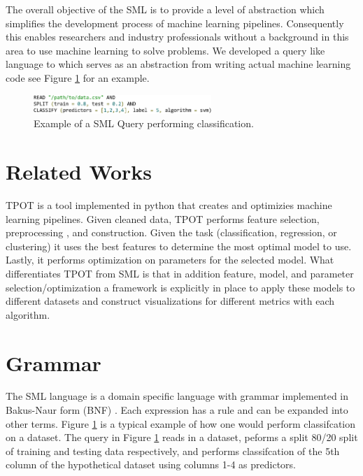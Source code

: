\documentclass[jair,twoside,11pt,theapa]{article}
\begin{document}
The overall objective of the SML is to provide a level of abstraction which simplifies the development process of machine learning pipelines. Consequently this enables researchers and industry professionals without a background in this area to use machine learning to solve problems. We developed a query like language to which serves as an abstraction from writing actual machine learning code see Figure \ref{fig:sml-ex-1} for an example.   

\begin{figure}
\includegraphics[width=0.6\textwidth]{figs/sml-ex-1.png}
\centering
\caption{Example of a SML Query performing classification.}
\label{fig:sml-ex-1}
\end{figure}

\section{Related Works}
\label{RelatedWorks}

TPOT \cite{TPOT} is a tool implemented in python that creates and optimizies machine learning pipelines. Given cleaned data, TPOT performs feature selection, preprocessing , and construction. Given the task (classification, regression, or clustering) it uses the best features to determine the most optimal model to use. Lastly, it performs optimization on parameters for the selected model. What differentiates TPOT from SML is that in addition feature, model, and parameter selection/optimization a framework is explicitly in place to apply these models to different datasets and construct visualizations for different metrics with each algorithm.

\section{Grammar}
\label{grammar}

The SML language is a domain specific language with grammar implemented in Bakus-Naur form (BNF) \cite{BNF}. Each expression has a rule and can be expanded into other terms. Figure \ref{fig:sml-ex-1} is a typical example of how one would perform classifcation on a dataset. The query in Figure \ref{fig:sml-ex-1} reads in a dataset, peforms a split 80/20 split of training and testing data respectively, and performs classifcation of the 5th column of the hypothetical dataset using columns 1-4 as predictors. 
\end{document}
